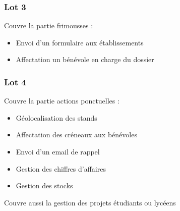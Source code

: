 \begin{frame}
	\frametitle{Lot 3}
	Couvre la partie frimousses :
	\begin{itemize}
		\item Envoi d'un formulaire aux établissements
		\item Affectation un bénévole en charge du dossier
	\end{itemize}
\end{frame}


\begin{frame}
	\frametitle{Lot 4}
	Couvre la partie actions ponctuelles :
	\begin{itemize}
		\item Géolocalisation des stands
		\item Affectation des créneaux aux bénévoles
		\item Envoi d'un email de rappel
		\item Gestion des chiffres d'affaires
		\item Gestion des stocks
	\end{itemize}
	Couvre aussi la gestion des projets étudiants ou lycéens
\end{frame}